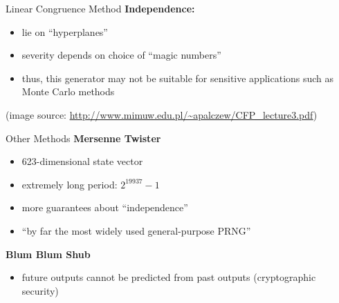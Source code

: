 \documentclass{beamer}
\begin{document}
\begin{frame}{Linear Congruence Method}
\textbf{Independence:} 
\begin{itemize}
	\item lie on ``hyperplanes''
    \item severity depends on choice of ``magic numbers''
    \pause \item thus, this generator may not be suitable for sensitive applications such as Monte Carlo methods
\end{itemize}
(image source: \url{http://www.mimuw.edu.pl/~apalczew/CFP_lecture3.pdf})
\end{frame}

\begin{frame}{Other Methods}
\pause \textbf{Mersenne Twister}
\begin{itemize}
\item 623-dimensional state vector
\item extremely long period: $2^{19937} − 1$
\item more guarantees about ``independence''
\item ``by far the most widely used general-purpose PRNG''
\end{itemize}

\pause \textbf{Blum Blum Shub}
\begin{itemize}
\item future outputs cannot be predicted from past outputs (cryptographic security)

\end{itemize}
\end{frame}
\end{document}
